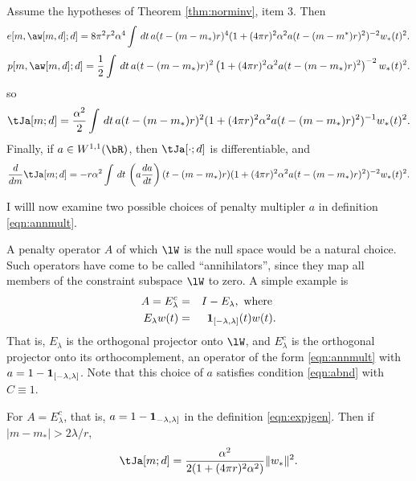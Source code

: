 \begin{corollary}
  \label{thm:epjnonoise}
  Assume the hypotheses of Theorem \ref{thm:norminv}, item 3. Then 
\begin{equation}
  \label{eqn:residnorm}
  e[m,\aw[m,d];d] 
= 8 \pi^2 r^2 \alpha^4\int\,dt\,a(t-(m-m_*)r)^4(1+(4\pi r)^2 \alpha^2 
    a(t-(m-m^*)r)^2)^{-2}w_*(t)^2.
\end{equation}
\begin{equation}
  \label{eqn:anninorm}
  p[m,\aw[m,d];d] = \frac{1}{2}\int \,dt\,  a(t-(m-m_*)r)^2 \left(1+ (4\pi r)^2\alpha^2
    a(t-(m-m_*)r)^2\right)^{-2}w_*(t)^2.
\end{equation}
so 
\begin{equation}
\label{eqn:expjnonoise}
\tJa[m;d] = \frac{\alpha^2}{2}\int\,dt\,a(t-(m-m_*)r)^2(1+(4\pi r)^2 \alpha^2 
  a(t-(m-m_*)r)^2)^{-1}w_*(t)^2. 
\end{equation}
Finally, if $a \in W^{1,1}(\bR)$, then $\tJa[\cdot;d]$ is differentiable, and 
\begin{equation}
  \label{eqn:dexpjnonoise}
  \frac{d}{dm}\tJa[m;d] = -r \alpha^2 \int \,dt \, 
  \left(a\frac{da}{dt}\right)(t-(m-m_*)r)(1+(4\pi r)^2 \alpha^2 
  a(t-(m-m_*)r)^2)^{-2}w_*(t)^2. 
\end{equation}
\end{corollary}

I willl now examine two possible choices of penalty multipler $a$ in
definition \ref{eqn:annmult}.

A penalty operator $A$ of which $\lW$ is the null space would be a
natural choice. Such operators have come to be called
``annihilators'', since they map all members of the constraint
subspace $\lW$ to zero.  A simple example is
\begin{eqnarray}
  A = E^c_{\lambda}&=&I - E_{\lambda},\mbox{ where } \nonumber \\
  E_{\lambda}w(t) &=&{\bf 1}_{[-\lambda,\lambda]}(t)w(t). 
                      \label{eqn:ann0}
\end{eqnarray}
That is, $E_{\lambda}$ is the orthogonal projector onto $\lW$,
and $E_{\lambda}^c$ is the orthogonal projector onto its
orthocomplement, an operator of the form \ref{eqn:annmult} with $a
= 1 - {\bf 1}_{[-\lambda,\lambda]}$. Note that this choice of $a$
satisfies condition \ref{eqn:abnd} with $C \equiv 1$.

\begin{theorem}
  \label{thm:boxcarbad}
  For $A=E^c_{\lambda}$, that is, $a=1-{\bf 1}_{-\lambda,\lambda]}$ in
  the definition \ref{eqn:expjgen}. Then if $|m-m_*| >  2\lambda/r$,
  \[
    \tJa[m;d] = \frac{\alpha^2}{2(1+(4 \pi r)^2 \alpha^2)}\|w_*\|^2.
  \]
\end{theorem}

